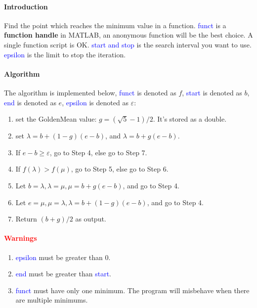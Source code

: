 \documentclass{article}
\begin{document}
\paragraph{Introduction}
Find the point which reaches the minimum value in a function. \textcolor{blue}{funct} is a \textbf{function handle} in MATLAB, an anonymous function will be the best choice. A single function script is OK. \textcolor{blue}{start and stop} is the search interval you want to use. \textcolor{blue}{epsilon} is the limit to stop the iteration.

\paragraph{Algorithm} 
The algorithm is implemented below, \textcolor{blue}{funct} is denoted as $f$, \textcolor{blue}{start} is denoted as $b$, \textcolor{blue}{end} is denoted as $e$, \textcolor{blue}{epsilon} is denoted as $\varepsilon$:
\begin{enumerate}
    \item set the GoldenMean value: $g = (\sqrt{5} - 1) / 2$. It's stored as a double.
    \item set $\lambda = b + (1 - g)(e - b)$, and $\lambda = b + g(e - b)$.
    \item If $e - b \geqslant \varepsilon$, go to Step 4, else go to Step 7.
    \item If $f(\lambda) > f(\mu)$, go to Step 5, else go to Step 6.
    \item Let $b = \lambda, \lambda = \mu, \mu = b + g(e - b)$, and go to Step 4.
    \item Let $e = \mu, \mu = \lambda, \lambda = b + (1 - g)(e - b)$, and go to Step 4.
    \item Return $(b + g) / 2$ as output.
\end{enumerate}

\paragraph{\textcolor{red}{Warnings}}
\begin{enumerate}
    \item \textcolor{blue}{epsilon} must be greater than $0$. 
    \item \textcolor{blue}{end} must be greater than \textcolor{blue}{start}.
    \item \textcolor{blue}{funct} must have only one minimum. The program will misbehave when there are multiple minimums.
\end{enumerate}
\end{document}
